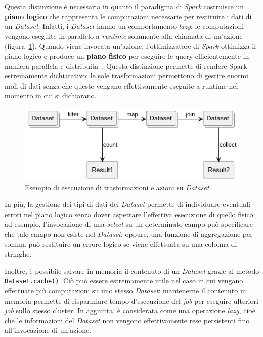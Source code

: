 Questa distinzione è necessaria in quanto il paradigma di \textit{Spark} costruisce un \textbf{piano logico} che rappresenta le computazioni necessarie per restituire i dati di un \textit{Dataset}.
Infatti, i \textit{Dataset} hanno un comportamento \textit{lazy}: le computazioni vengono eseguite in parallelo a \textit{runtime} solamente alla chiamata di un'azione (figura~\ref{fig:transformations-actions}).
Quando viene invocata un'azione, l'ottimizzatore di \textit{Spark} ottimizza il piano logico e produce un \textbf{piano fisico} per eseguire le query efficientemente in maniera parallela e distribuita~\cite{spark-dataset}.
Questa distinzione permette di rendere Spark estremamente dichiarativo:
le sole trasformazioni permettono di gestire enormi moli di dati senza che queste vengano effettivamente eseguite a runtime nel momento in cui si dichiarano.
\begin{figure}[H]
    \includegraphics[width=\textwidth]{img/transformations-actions.png}
    \centering
    \caption{Esempio di esecuzione di trasformazioni e azioni su \textit{Dataset}.}
    \label{fig:transformations-actions}
\end{figure}
In più, la gestione dei tipi di dati dei \textit{Dataset} permette di individuare eventuali errori nel piano logico senza dover aspettare l'effettiva esecuzione di quello fisico;
ad esempio, l'invocazione di una \textit{select} su un determinato campo può specificare che tale campo non esiste nel \textit{Dataset};
oppure, una funzione di aggregazione per somma può restituire un errore logico se viene effettuata su una colonna di stringhe.

Inoltre, è possibile salvare in memoria il contenuto di un \textit{Dataset} grazie al metodo \texttt{Dataset.cache()}.
Ciò può essere estremamente utile nel caso in cui vengano effettuate più computazioni su uno stesso \textit{Dataset}:
mantenerne il contenuto in memoria permette di risparmiare tempo d'esecuzione del \textit{job} per eseguire ulteriori \textit{job} sullo stesso cluster.
In aggiunta, è considerata come una operazione \textit{lazy}, cioè che le informazioni del \textit{Dataset} non vengono effettivamente rese persistenti fino all'invocazione di un'azione.

